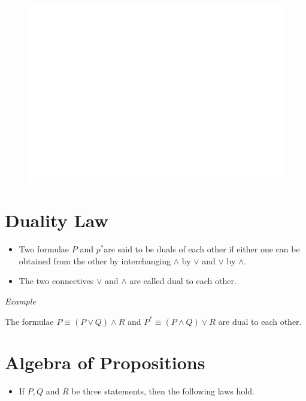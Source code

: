 \documentclass[]{book}
\providecommand{\tightlist}{%
  \setlength{\itemsep}{0pt}\setlength{\parskip}{0pt}}
\begin{document}
\begin{figure}

{\centering \includegraphics[width=1\linewidth]{figure/boxC37-1} 

}

\end{figure}

\hypertarget{duality-law}{%
\section{Duality Law}\label{duality-law}}

\begin{itemize}
\tightlist
\item
  Two formulae \(P\) and \(p^*\)are said to be duals of each other if either one can be obtained from the other by interchanging \(\land\) by \(\lor\) and \(\lor\) by \(\land\).
\item
  The two connectives \(\lor\) and \(\land\) are called dual to each other.
\end{itemize}

\emph{Example}

The formulae \(P \equiv (P \lor Q)\land R\) and \(P^* \equiv (P \land Q)\lor R\) are dual to each other.

\newpage

\hypertarget{algebra-of-propositions}{%
\section{Algebra of Propositions}\label{algebra-of-propositions}}

\begin{itemize}
\tightlist
\item
  If \(P, Q\) and \(R\) be three statements, then the following laws hold.
\end{itemize}
\end{document}
